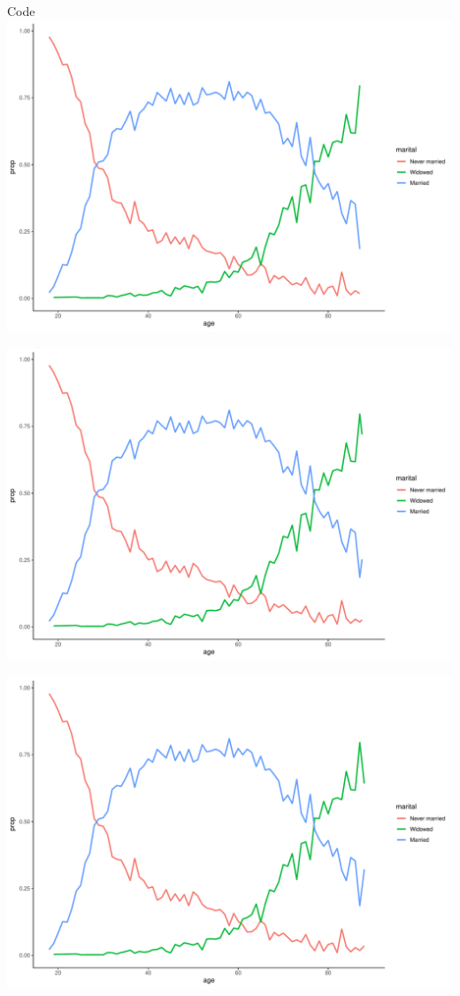 \documentclass[
  ignorenonframetext,
]{beamer}
\begin{document}
\begin{frame}[fragile]{Code}
\includegraphics{gss_cat_files/figure-beamer/unnamed-chunk-1-101.pdf}

\includegraphics{gss_cat_files/figure-beamer/unnamed-chunk-1-102.pdf}

\includegraphics{gss_cat_files/figure-beamer/unnamed-chunk-1-103.pdf}


\end{frame}
\end{document}
